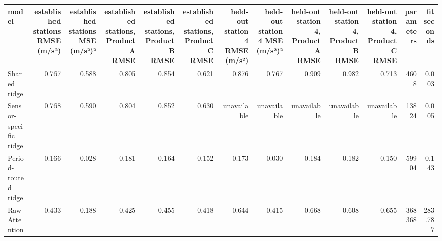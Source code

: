 \begin{tabular}{lrrrrrrrrrrrr}
\toprule
model & established stations RMSE (m/s²) & established stations MSE (m/s²)² & established stations, Product A RMSE & established stations, Product B RMSE & established stations, Product C RMSE & held-out station 4 RMSE (m/s²) & held-out station 4 MSE (m/s²)² & held-out station 4, Product A RMSE & held-out station 4, Product B RMSE & held-out station 4, Product C RMSE & parameters & fit seconds \\
\midrule
Shared ridge & 0.767 & 0.588 & 0.805 & 0.854 & 0.621 & 0.876 & 0.767 & 0.909 & 0.982 & 0.713 & 4608 & 0.003 \\
Sensor-specific ridge & 0.768 & 0.590 & 0.804 & 0.852 & 0.630 & unavailable & unavailable & unavailable & unavailable & unavailable & 13824 & 0.005 \\
Period-routed ridge & 0.166 & 0.028 & 0.181 & 0.164 & 0.152 & 0.173 & 0.030 & 0.184 & 0.182 & 0.150 & 59904 & 0.143 \\
Raw Attention & 0.433 & 0.188 & 0.425 & 0.455 & 0.418 & 0.644 & 0.415 & 0.668 & 0.608 & 0.655 & 368368 & 283.787 \\
\bottomrule
\end{tabular}
